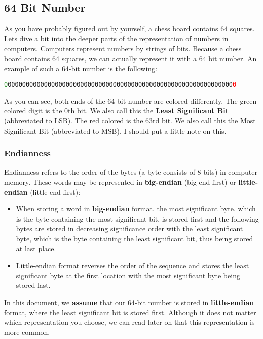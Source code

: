 \subsection{64 Bit Number}
As you have probably figured out by yourself, a chess board contains 64 squares. 
Lets dive a bit into the deeper parts of the representation of numbers in computers.
Computers represent numbers by strings of bits.
Because a chess board contains 64 squares, we can actually represent it with a 64 bit number.
An example of such a 64-bit number is the following:
%
\begin{center}
	\texttt{\textcolor{green}{0}00000000000000000000000000000000000000000000000000000000000000\textcolor{red}{0}}
\end{center}
%
As you can see, both ends of the 64-bit number are colored differently.
The green colored digit is the 0th bit. 
We also call this the \textbf{Least Significant Bit} (abbreviated to LSB).
The red colored is the 63rd bit. We also call this the Most Significant Bit (abbreviated to MSB).
I should put a little note on this.

\subsubsection{Endianness}
Endianness refers to the order of the bytes (a byte consists of 8 bits) in computer memory. 
These words may be represented in \textbf{big-endian} (big end first) or \textbf{little-endian} (little end first):
%
\begin{itemize}
	\item When storing a word in \textbf{big-endian} format, the most significant byte, which is the byte containing the most significant bit, is stored first and the following bytes are stored in decreasing significance order with the least significant byte, which is the byte containing the least significant bit, thus being stored at last place.
	\item Little-endian format reverses the order of the sequence and stores the least significant byte at the first location with the most significant byte being stored last.
\end{itemize}
%
In this document, we \textbf{assume} that our 64-bit number is stored in \textbf{little-endian} format, where the least significant bit is stored first. 
Although it does not matter which representation you choose, we can read later on that this representation is more common.


